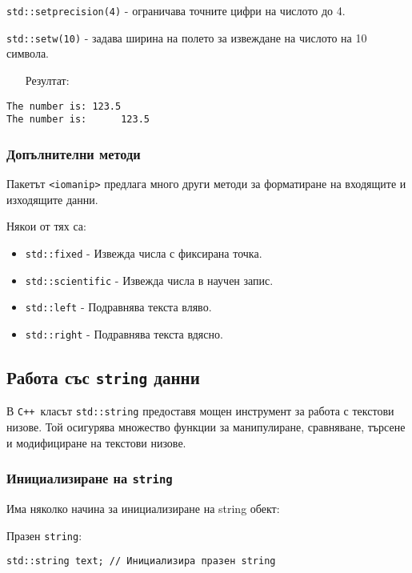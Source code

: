 \documentclass[oneside]{book}
\newcommand*{\code}[1]{\texttt{#1}}
\newcommand*{\cpp}{\texttt{C++}\ }
\begin{document}
\code{std::setprecision(4)} - ограничава точните цифри на числото до 4.

\code{std::setw(10)} - задава ширина на полето за извеждане на числото на 10 символа.

\begin{itemize}\item[Резултат:]\end{itemize} 
\vspace{-4pt}\begin{mdframed}\begin{lstlisting}[language={}]
The number is: 123.5
The number is:      123.5
\end{lstlisting}\end{mdframed}

\subsubsection{Допълнителни методи}
Пакетът \code{<iomanip>} предлага много други методи за форматиране на входящите и изходящите данни.

Някои от тях са:
\begin{itemize}
    \item \code{std::fixed} - Извежда числа с фиксирана точка.
    \item \code{std::scientific} - Извежда числа в научен запис.
    \item \code{std::left} - Подравнява текста вляво.
    \item \code{std::right} - Подравнява текста вдясно.
\end{itemize}

\subsection{Работа със \code{string} данни}\label{sec:string}
В \cpp класът \code{std::string} предоставя мощен инструмент за работа с текстови низове. Той осигурява множество функции за манипулиране, сравняване, търсене и модифициране на текстови низове.

\subsubsection{Инициализиране на \code{string}}
Има няколко начина за инициализиране на string обект:

Празен \code{string}:
\begin{mdframed}\begin{lstlisting}
std::string text; // Инициализира празен string
\end{lstlisting}\end{mdframed}
\end{document}
